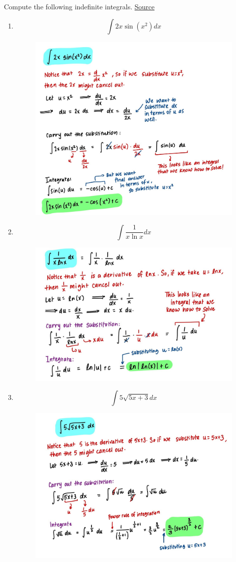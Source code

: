 \documentclass{article}
\begin{document}
Compute the following indefinite integrals. 
\newline \noindent\href{https://s3.amazonaws.com/calculus-worksheets/calculus-1-tutor/Calculus+1+Tutor+-+Worksheet+11+-+Integration+by+Substitution.pdf}{Source}

\begin{enumerate}
    \item $$\int{2x\sin(x^2)} dx$$
    \begin{figure}[H]
        \centering
        \includegraphics[width=0.6\linewidth]{Q1.jpg}
        \label{fig:Q1}
    \end{figure}
    \item $$\int{\frac{1}{x\ln x}} dx$$
    \begin{figure}[H]
        \centering
        \includegraphics[width=0.6\linewidth]{Q2.jpg}
        \label{fig:Q2}
    \end{figure}
    \item $$\int{5\sqrt{5x+3}} dx$$
     \begin{figure}[H]
        \centering
        \includegraphics[width=0.8\linewidth]{Q3.jpg}

\end{figure}
\end{enumerate}
\end{document}
